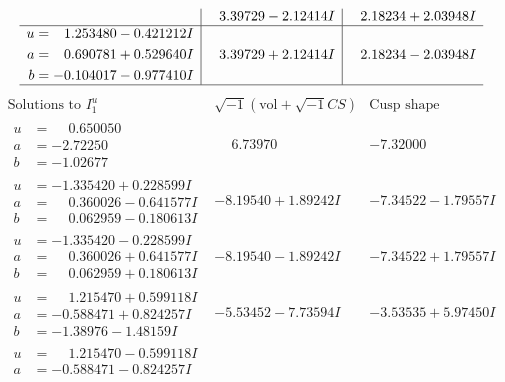 \documentclass[1p]{elsarticle_modified}
\theoremstyle{definition}
\newcommand{\I}{\sqrt{-1}}
\begin{document}
$$\begin{array}{c|c|c}
 & \phantom{-}3.39729 - 2.12414 I & \phantom{-}2.18234 + 2.03948 I \\ \hline\begin{aligned}
u &= \phantom{-}1.253480 - 0.421212 I \\
a &= \phantom{-}0.690781 + 0.529640 I \\
b &= -0.104017 - 0.977410 I\end{aligned}
 & \phantom{-}3.39729 + 2.12414 I & \phantom{-}2.18234 - 2.03948 I\\
 \hline 
 \end{array}$$\newpage$$\begin{array}{c|c|c}  
\text{Solutions to }I^u_{1}& \I (\text{vol} + \sqrt{-1}CS) & \text{Cusp shape}\\
 \hline 
\begin{aligned}
u &= \phantom{-}0.650050\phantom{ +0.000000I} \\
a &= -2.72250\phantom{ +0.000000I} \\
b &= -1.02677\phantom{ +0.000000I}\end{aligned}
 & \phantom{-}6.73970\phantom{ +0.000000I} & -7.32000\phantom{ +0.000000I} \\ \hline\begin{aligned}
u &= -1.335420 + 0.228599 I \\
a &= \phantom{-}0.360026 - 0.641577 I \\
b &= \phantom{-}0.062959 - 0.180613 I\end{aligned}
 & -8.19540 + 1.89242 I & -7.34522 - 1.79557 I \\ \hline\begin{aligned}
u &= -1.335420 - 0.228599 I \\
a &= \phantom{-}0.360026 + 0.641577 I \\
b &= \phantom{-}0.062959 + 0.180613 I\end{aligned}
 & -8.19540 - 1.89242 I & -7.34522 + 1.79557 I \\ \hline\begin{aligned}
u &= \phantom{-}1.215470 + 0.599118 I \\
a &= -0.588471 + 0.824257 I \\
b &= -1.38976 - 1.48159 I\end{aligned}
 & -5.53452 - 7.73594 I & -3.53535 + 5.97450 I \\ \hline\begin{aligned}
u &= \phantom{-}1.215470 - 0.599118 I \\
a &= -0.588471 - 0.824257 I \\

\end{aligned}
\end{array}$$
\end{document}
